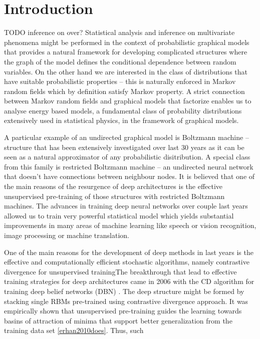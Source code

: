 \chapter{Introduction}
TODO inference on over?
Statistical analysis and inference on multivariate phenomena might be performed in the context of probabilistic graphical models that provides a natural framework for developing complicated structures where the graph of the model defines the conditional dependence between random variables. On the other hand we are interested in the class of distributions that have suitable probabilistic properties -- this is naturally enforced in Markov random fields which by definition satisfy Markov property. A strict connection between Markov random fields and graphical models that factorize enables us to analyse energy based models, a fundamental class of probability distributions extensively used in statistical physics, in the framework of graphical models.

A particular example of an undirected graphical model is Boltzmann machine -- structure that has been extensively investigated over last $30$ years as it can be seen as a natural approximator of any probabilistic disitribution. A special class from this family is restricted Boltzmann machine -- an undirected neural network that doesn't have connections between neighbour nodes. It is believed that one of the main reasons of the resurgence of deep architectures is the effective unsupervised pre-training of those structures with restricted Boltzmann machines. The advances in training deep neural networks over couple last years allowed us to train very powerful statistical model which yields substantial improvements in many areas of machine learning like speech or vision recognition, image processing or machine translation. 

One of the main reasons for the development of deep methods in last years is the effective and computationally efficient stochastic algorithms, namely contrastive divergence for unsupervised trainingThe breakthrough that lead to effective training strategies for deep architectures came in 2006 with the CD algorithm for training deep belief networks (DBN) \cite{hinton2006reducing}. The deep structure might be formed by stacking single RBMs pre-trained using contrastive divergence approach. It was empirically shown that unsupervised pre-training guides the learning towards basins of attraction of minima that support better generalization from the training data set \ref{erhan2010does}. Thus, such 

